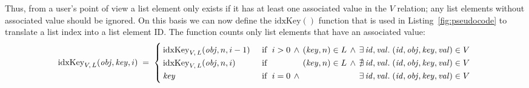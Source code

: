 Thus, from a user's point of view a list element only exists if it has at least one associated value in the $V$ relation; any list elements without associated value should be ignored.
On this basis we can now define the $\mathrm{idxKey}()$ function that is used in Listing~\ref{fig:pseudocode} to translate a list index into a list element ID.
The function counts only list elements that have an associated value:
\[ \mathrm{idxKey}_{V,\, L}(\mathit{obj}, \mathit{key}, i) \;=\; \left\{
   \arraycolsep=2pt \def\arraystretch{1.3}
   \begin{array}{llllll}
       \mathrm{idxKey}_{V,\, L}(\mathit{obj}, n, i-1) &
       \quad\text{if }\; i > 0 & \wedge & (\mathit{key}, n) \in L & \wedge &
       \exists\,\mathit{id}, \mathit{val}.\; (\mathit{id}, \mathit{obj}, \mathit{key}, \mathit{val}) \in V \\
       \mathrm{idxKey}_{V,\, L}(\mathit{obj}, n, i) &
       \quad\text{if }\; && (\mathit{key}, n) \in L & \wedge &
       \nexists\,\mathit{id}, \mathit{val}.\; (\mathit{id}, \mathit{obj}, \mathit{key}, \mathit{val}) \in V \\
       \mathit{key} &
       \quad\text{if }\; i = 0 & \wedge &&&
       \exists\,\mathit{id}, \mathit{val}.\; (\mathit{id}, \mathit{obj}, \mathit{key}, \mathit{val}) \in V \\
   \end{array} \right. \]
